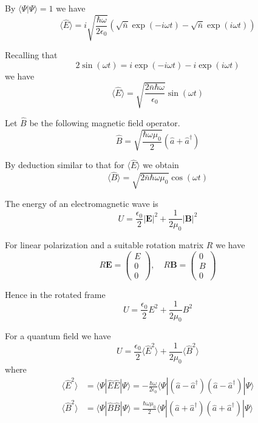 \documentclass[12pt]{article}
\begin{document}
By $\langle\Psi|\Psi\rangle=1$ we have
\begin{equation*}
\langle\hat E\rangle
=i\sqrt{\frac{\hbar\omega}{2\epsilon_0}}
\left(\sqrt{\bar n}\exp(-i\omega t)-\sqrt{\bar n}\exp(i\omega t)\right)
\end{equation*}

Recalling that
\begin{equation*}
2\sin(\omega t)=i\exp(-i\omega t)-i\exp(i\omega t)
\end{equation*}
we have
\begin{equation*}
\langle\hat E\rangle=\sqrt{\frac{2\bar n\hbar\omega}{\epsilon_0}}\sin(\omega t)
\end{equation*}

Let $\hat B$ be the following magnetic field operator.
\begin{equation*}
\hat B=\sqrt{\frac{\hbar\omega\mu_0}{2}}
(\hat a+\hat a^\dag)
\end{equation*}

By deduction similar to that for $\langle\hat E\rangle$ we obtain
\begin{equation*}
\langle\hat B\rangle=\sqrt{2\bar n\hbar\omega\mu_0}\cos(\omega t)
\end{equation*}

The energy of an electromagnetic wave is
\begin{equation*}
U=\frac{\epsilon_0}{2}|\mathbf E|^2+\frac{1}{2\mu_0}|\mathbf B|^2
\end{equation*}

For linear polarization and a suitable rotation matrix $R$ we have
\begin{equation*}
R\mathbf E=\begin{pmatrix}E\\0\\0\end{pmatrix},
\quad
R\mathbf B=\begin{pmatrix}0\\B\\0\end{pmatrix}
\end{equation*}

Hence in the rotated frame
\begin{equation*}
U=\frac{\epsilon_0}{2}E^2+\frac{1}{2\mu_0}B^2
\end{equation*}

For a quantum field we have
\begin{equation*}
U=\frac{\epsilon_0}{2}\langle\hat E^2\rangle+\frac{1}{2\mu_0}\langle\hat B^2\rangle
\end{equation*}
where
\begin{align*}
\langle\hat E^2\rangle
&=\langle\Psi|\hat E\hat E|\Psi\rangle
=-\frac{\hbar\omega}{2\epsilon_0}
\langle\Psi|(\hat a-\hat a^\dag)(\hat a-\hat a^\dag)|\Psi\rangle
\\
\langle\hat B^2\rangle
&=\langle\Psi|\hat B\hat B|\Psi\rangle
=\frac{\hbar\omega\mu_0}{2}
\langle\Psi|(\hat a+\hat a^\dag)(\hat a+\hat a^\dag)|\Psi\rangle
\end{align*}
\end{document}
